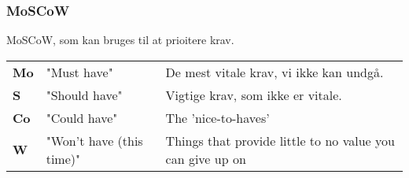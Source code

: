 \subsubsection{MoSCoW}
MoSCoW, som kan bruges til at prioitere krav.
\begin{tabular}{lll}
    \textbf{Mo} &   "Must have"                 & De mest vitale krav, vi ikke kan undgå. \\
    \textbf{S}  &   "Should have"               & Vigtige krav, som ikke er vitale. \\
    \textbf{Co} &   "Could have"                & The 'nice-to-haves' \\
    \textbf{W}  &   "Won’t have (this time)"    & Things that provide little to no value you can give up on
\end{tabular}
\\